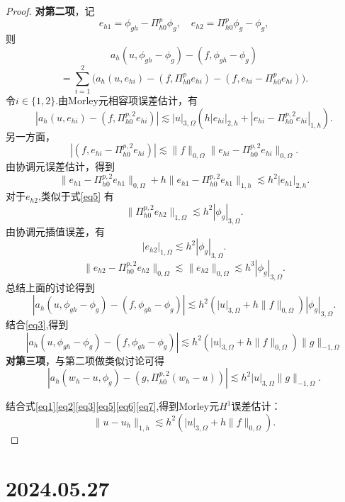 \documentclass[12pt,a4paper]{article}
\begin{document}
\begin{enumerate}
\begin{proof}
			\textbf{对第二项}，记
			$$e_{h1}=\phi_{gh}-\Pi_{h0}^p\phi_g,\quad e_{h2}=\Pi_{h0}^p\phi_g-\phi_g,$$
			则
			$$a_h(u,\phi_{gh}-\phi_g)-(f,\phi_{gh}-\phi_g)$$
			$$=\sum_{i=1}^2\Big(a_h(u,e_{hi})-(f,\Pi_{h0}^pe_{hi})-(f,e_{hi}-\Pi_{h0}^pe_{hi})\Big).$$
			令$i\in\{1,2\}.$由Morley元相容项误差估计，有
			$$\left|a_h(u,e_{hi})-(f,\Pi_{h0}^{p,2}e_{hi})\right|\lesssim|u|_{3,\Omega}\left(h|e_{hi}|_{2,h}+|e_{hi}-\Pi_{h0}^{p,2}e_{hi}|_{1,h}\right).$$
			另一方面，
			$$|(f,e_{hi}-\Pi_{h0}^{p,2}e_{hi})|\lesssim\|f\|_{0,\Omega}\|e_{hi}-\Pi_{h0}^{p,2}e_{hi}\|_{0,\Omega}.$$
			由协调元误差估计，得到
			$$\|e_{h1}-\Pi_{h0}^{p,2}e_{h1}\|_{0,\Omega}+h\|e_{h1}-\Pi_{h0}^{p,2}e_{h1}\|_{1,h}\lesssim h^2|e_{h1}|_{2,h}.$$
			对于$e_{h2}$,类似于式\eqref{eq5} 有
			$$\|\Pi_{h0}^{p,2}e_{h2}\|_{1,\Omega}\lesssim h^2|\phi_g|_{3,\Omega}.$$
			由协调元插值误差，有
			$$|e_{h2}|_{1,\Omega}\lesssim h^2|\phi_g|_{3,\Omega}.$$
			$$\|e_{h2}-\Pi_{h0}^{p,2}e_{h2}\|_{0,\Omega}\lesssim\|e_{h2}\|_{0,\Omega}\lesssim h^3|\phi_g|_{3,\Omega}.$$
			总结上面的讨论得到
			$$|a_h(u,\phi_{gh}-\phi_g)-(f,\phi_{gh}-\phi_g)|\lesssim h^2(|u|_{3,\Omega}+h\|f\|_{0,\Omega})|\phi_g|_{3,\Omega}.$$
			结合\eqref{eq3},得到
			\begin{equation}\label{eq6}
				|a_h(u,\phi_{gh}-\phi_g)-(f,\phi_{gh}-\phi_g)|\lesssim h^2(|u|_{3,\Omega}+h\|f\|_{0,\Omega})\|g\|_{-1,\Omega}
			\end{equation}
			\textbf{对第三项}，与第二项做类似讨论可得
			\begin{equation}\label{eq7}
				|a_h(w_h-u,\phi_g)-(g,\Pi_{h0}^{p,2}(w_h-u))|\lesssim h^2|u|_{3,\Omega}\|g\|_{-1,\Omega}.
			\end{equation}
			
			结合式\eqref{eq1}\eqref{eq2}\eqref{eq3}\eqref{eq5}\eqref{eq6}\eqref{eq7},得到Morley元$H^1$误差估计：
			$$
			\|u-u_h\|_{1,h}\lesssim h^2\left(|u|_{3,\Omega}+h\|f\|_{0,\Omega}\right).
			$$
		\end{proof}
	\end{enumerate}
	
	\newpage
	
		\section*{2024.05.27}	
	
\end{document}
